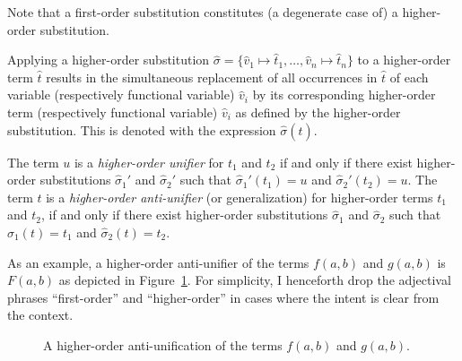 Note that a first-order substitution constitutes (a degenerate case of) a higher-order substitution.

\begin{defn}\label{def:substitution}
Applying a higher-order substitution $\hat{\sigma} = \{\hat{v}_1 \mapsto \hat{t}_1, \ldots, \hat{v}_n \mapsto \hat{t}_n\}$ to a higher-order term $\hat{t}$ results in the simultaneous replacement of all occurrences in $\hat{t}$ of each variable (respectively functional variable) $\hat{v}_i$ by its corresponding higher-order term (respectively functional variable) $\hat{v}_i$ as defined by the higher-order substitution. This is denoted with the expression $\hat{\sigma}(\hat{t})$.
\end{defn}

\begin{defn}\label{def:generalization}
The term $u$ is a \emph{higher-order unifier} for $t_1$ and $t_2$ if and only if there exist higher-order substitutions $\hat{\sigma}_1'$ and $\hat{\sigma}_2'$ such that $\hat{\sigma}_1'(t_1)=u$ and $\hat{\sigma}_2'(t_2)=u$.  The term $t$ is a \emph{higher-order anti-unifier} (or generalization) for higher-order terms $t_1$ and $t_2$, if and only if there exist higher-order substitutions $\hat{\sigma}_1$ and $\hat{\sigma}_2$ such that $\hat{\sigma}_1(t)=t_1$ and $\hat{\sigma}_2(t)=t_2$.
\end{defn}

As an example, a higher-order anti-unifier of the terms $f(a,b)$ and $g(a,b)$ is $F(a,b)$ as depicted in Figure~\ref{fig:higher-anti-uni}.   For simplicity, I henceforth drop the adjectival phrases ``first-order'' and ``higher-order'' in cases where the intent is clear from the context.

\begin{figure}[t]
\centering{}
\caption{A higher-order anti-unification of the terms $f(a,b)$ and $g(a,b)$.\label{fig:higher-anti-uni}}
\end{figure}

